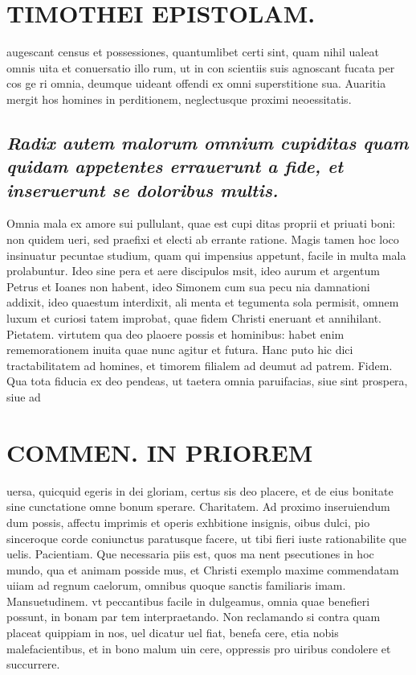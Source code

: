 \documentclass{article}
\begin{document}
\begin{pages}
\section*{TIMOTHEI EPISTOLAM. }
\marginpar{[ p.169 ]}\pstart augescant census et possessiones, quantumlibet certi sint, quam nihil ualeat omnis uita et conuersatio illo rum, ut in con scientiis suis agnoscant fucata per cos ge ri omnia, deumque uideant offendi ex omni superstitione sua. Auaritia mergit hos homines in perditionem, neglectusque proximi neoessitatis.  \pend
{}
{}
\subsection*{\textit{Radix autem malorum omnium cupiditas quam quidam appetentes errauerunt a fide, et inseruerunt se doloribus multis. }}\pstart Omnia mala ex amore sui pullulant, quae est cupi ditas proprii et priuati boni: non quidem ueri, sed praefixi et electi ab errante ratione. Magis tamen hoc loco insinuatur pecuntae studium, quam qui impensius appetunt, facile in multa mala prolabuntur. Ideo sine pera et aere discipulos msit, ideo aurum et argentum Petrus et Ioanes non habent, ideo Simonem cum sua pecu nia damnationi addixit, ideo quaestum interdixit, ali menta et tegumenta sola permisit, omnem luxum et curiosi tatem improbat, quae fidem Christi eneruant et annihilant.  \pend\pstart Pietatem. virtutem qua deo plaoere possis et hominibus: habet enim rememorationem inuita quae nunc agitur et futura. Hanc puto hic dici tractabilitatem ad homines, et timorem filialem ad deumut ad patrem.  \pend\pstart Fidem. Qua tota fiducia ex deo pendeas, ut taetera omnia paruifacias, siue sint prospera, siue ad  \pend
\section*{COMMEN. IN PRIOREM }
\marginpar{[ p.170 ]}\pstart uersa, quicquid egeris in dei gloriam, certus sis deo placere, et de eius bonitate sine cunctatione omne bonum sperare.  \pend\pstart Charitatem. Ad proximo inseruiendum dum possis, affectu imprimis et operis exhbitione insignis, oibus dulci, pio sinceroque corde coniunctus paratusque facere, ut tibi fieri iuste rationabilite que uelis.  \pend\pstart Pacientiam. Que necessaria piis est, quos ma nent psecutiones in hoc mundo, qua et animam posside mus, et Christi exemplo maxime commendatam uiiam ad regnum caelorum, omnibus quoque sanctis familiaris imam.  \pend\pstart Mansuetudinem. vt peccantibus facile in dulgeamus, omnia quae benefieri possunt, in bonam par tem interpraetando. Non reclamando si contra quam placeat quippiam in nos, uel dicatur uel fiat, benefa cere, etia nobis malefacientibus, et in bono malum uin cere, oppressis pro uiribus condolere et succurrere.  \pend
{}
{}

\end{pages}
\end{document}
